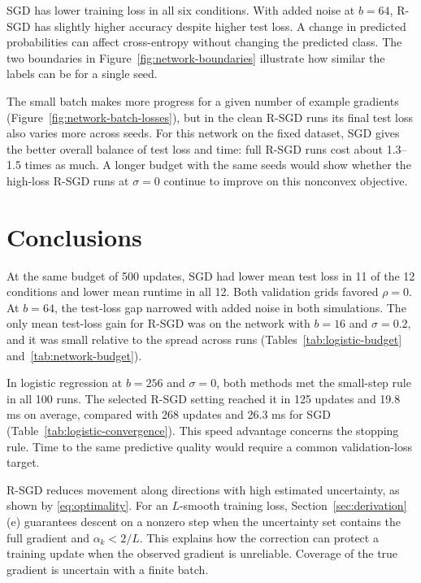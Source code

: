 \documentclass[11pt,a4paper]{article}
\begin{document}
SGD has lower training loss in all six conditions. With added
noise at $b=64$, R-SGD has slightly higher accuracy despite
higher test loss. A change in predicted probabilities can affect
cross-entropy without changing the predicted class. The two
boundaries in Figure~\ref{fig:network-boundaries} illustrate how
similar the labels can be for a single seed.

The small batch makes more progress for a given number of example
gradients (Figure~\ref{fig:network-batch-losses}), but in the clean
R-SGD runs its final test loss also varies more across seeds.
For this network on the fixed dataset, SGD gives the better
overall balance of test loss and time: full R-SGD runs cost
about 1.3--1.5 times as much. A longer budget with the same seeds
would show whether the high-loss R-SGD runs at $\sigma=0$ continue
to improve on this nonconvex objective.

\clearpage

\section{Conclusions}

At the same budget of 500 updates, SGD had lower mean test loss in
11 of the 12 conditions and lower mean runtime in all 12. Both
validation grids favored $\rho=0$. At $b=64$, the test-loss
gap narrowed with added noise in both simulations. The only mean
test-loss gain for R-SGD was on the network with $b=16$ and
$\sigma=0.2$, and it was small relative to the spread across runs
(Tables~\ref{tab:logistic-budget} and~\ref{tab:network-budget}).

In logistic regression at $b=256$ and $\sigma=0$, both methods met the
small-step rule in all 100 runs. The selected R-SGD setting reached
it in 125 updates and 19.8 ms on average, compared with 268 updates
and 26.3 ms for SGD (Table~\ref{tab:logistic-convergence}). This
speed advantage concerns the stopping rule. Time to the same
predictive quality would require a common validation-loss target.

R-SGD reduces movement along directions with high estimated
uncertainty, as shown by \eqref{eq:optimality}. For an $L$-smooth
training loss, Section~\ref{sec:derivation}(e) guarantees descent
on a nonzero step when the uncertainty set contains the full
gradient and $\alpha_k<2/L$. This explains how the correction can
protect a training update when the observed gradient is unreliable.
Coverage of the true gradient is uncertain with a finite batch.
\end{document}
